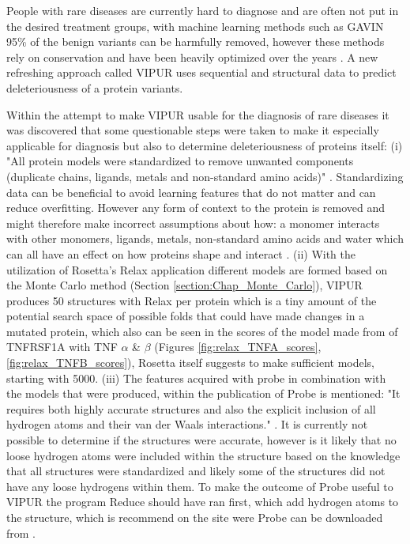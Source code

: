 People with rare diseases are currently hard to diagnose and are often not put in the desired treatment groups, with machine learning methods such as GAVIN 95\% of the benign variants can be harmfully removed, however these methods rely on conservation and have been heavily optimized over the years \cite{}.
A new refreshing approach called VIPUR uses sequential and structural data to predict deleteriousness of a protein variants.

Within the attempt to make VIPUR usable for the diagnosis of rare diseases it was discovered that some questionable steps were taken to make it especially applicable for diagnosis but also to determine deleteriousness of proteins itself: (i) "All protein models were standardized to remove unwanted components (duplicate chains, ligands, metals and non-standard amino acids)" \cite{}.
Standardizing data can be beneficial to avoid learning features that do not matter and can reduce overfitting. However any form of context to the protein is removed and might therefore make incorrect assumptions about how: a monomer interacts with other monomers, ligands, metals, non-standard amino acids and water which can all have an effect on how proteins shape and interact \cite{}.
(ii) With the utilization of Rosetta's Relax application different models are formed based on the Monte Carlo method (Section \ref{section:Chap_Monte_Carlo}), VIPUR produces 50 structures with Relax per protein which is a tiny amount of the potential search space of possible folds that could have made changes in a mutated protein, which also can be seen in the scores of the model made from of TNFRSF1A with TNF $\alpha$ \& $\beta$ (Figures \ref{fig:relax_TNFA_scores}, \ref{fig:relax_TNFB_scores}), Rosetta itself suggests to make sufficient models, starting with 5000\cite{}.
(iii) The features acquired with probe in combination with the models that were produced, within the publication of Probe is mentioned: "It requires both highly accurate structures and also the explicit inclusion of all hydrogen atoms and their van der Waals interactions." \cite{}.
It is currently not possible to determine if the structures were accurate, however is it likely that no loose hydrogen atoms were included within the structure based on the knowledge that all structures were standardized and likely some of the structures did not have any loose hydrogens within them. To make the outcome of Probe useful to VIPUR the program Reduce should have ran first, which add hydrogen atoms to the structure, which is recommend on the site were Probe can be downloaded from \cite{}.
